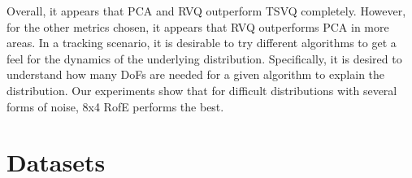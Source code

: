 Overall, it appears that PCA and RVQ outperform TSVQ completely.  However, for the other metrics chosen, it appears that RVQ outperforms PCA in more areas.  In a tracking scenario, it is desirable to try different algorithms to get a feel for the dynamics of the underlying distribution.  Specifically, it is desired to understand how many DoFs are needed for a given algorithm to explain the distribution.  Our experiments show that for difficult distributions with several forms of noise, 8x4 RofE performs the best.


%



\appendix
\clearpage
\newpage
\section{Datasets}
\label{App:dataset_snapshots}

